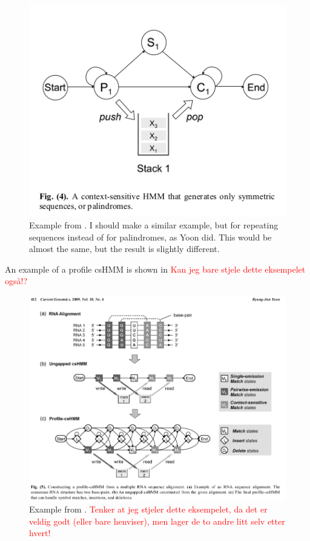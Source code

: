\documentclass{article}
\begin{document}
\begin{figure}
    \centering
    \includegraphics[width = \textwidth]{ExampleYooncsHMM.png}
    \caption{Example from \cite{Yoon2009}. I should make a similar example, but for repeating sequences instead of for palindromes, as Yoon did. This would be almost the same, but the result is slightly different.}
    \label{fig:Yoon2009ContextSensitiveHMMExample}
\end{figure}

An example of a profile csHMM is shown in \cite{Yoon2009} \textcolor{red}{Kan jeg bare stjele dette eksempelet også!?}

\begin{figure}
    \centering
    \includegraphics[width = \textwidth]{contextSensHMMExampleYoon.png}
    \caption{Example from \cite{Yoon2009}. \textcolor{red}{Tenker at jeg stjeler dette eksempelet, da det er veldig godt (eller bare henviser), men lager de to andre litt selv etter hvert!}}
    \label{fig:Yoon2009ProfileContextSensitiveHMMExample}
\end{figure}
\end{document}
